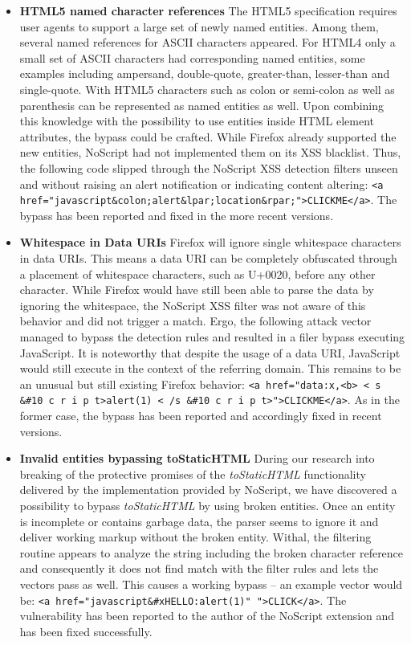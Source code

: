       \begin{itemize}
       \item \textbf{HTML5 named character references} The HTML5 specification requires user agents to support a large set of newly named entities. Among them, several named references for ASCII characters appeared. For HTML4 only a small set of ASCII characters had corresponding named entities, some examples including ampersand, double-quote, greater-than, lesser-than and single-quote. With HTML5 characters such as colon or semi-colon as well as parenthesis can be represented as named entities as well. Upon combining this knowledge with the possibility to use entities inside HTML element attributes, the bypass could be crafted. While Firefox already supported the new entities, NoScript had not implemented them on its XSS blacklist. Thus, the following code slipped through the NoScript XSS detection filters unseen and without raising an alert notification or indicating content altering: \texttt{<a href="javascript\&colon;alert\&lpar;location\&rpar;">CLICKME</a>}. The bypass has been reported and fixed in the 
more recent versions.
       \item \textbf{Whitespace in Data URIs} Firefox will ignore single whitespace characters in data URIs. This means a data URI can be completely obfuscated through a placement of whitespace characters, such as U+0020, before any other character. While Firefox would have still been able to parse the data by ignoring the whitespace, the NoScript XSS filter was not aware of this behavior and did not trigger a match. Ergo, the following attack vector managed to bypass the detection rules and resulted in a filer bypass executing JavaScript. It is noteworthy that despite the usage of a data URI, JavaScript would still execute in the context of the referring domain. This remains to be an unusual but still existing Firefox behavior: \texttt{<a href="data:x,<b> < s \&\#10 c r i p t>alert(1) < /s \&\#10 c r i p t>">CLICKME</a>}. As in the former case, the bypass has been reported and accordingly fixed in recent versions.
       \item \textbf{Invalid entities bypassing toStaticHTML} During our research into breaking of the protective promises of the \textit{toStaticHTML} functionality delivered by the implementation provided by NoScript, we have discovered a possibility to bypass \textit{toStaticHTML} by using broken entities. Once an entity is incomplete or contains garbage data, the parser seems to ignore it and deliver working markup without the broken entity. Withal, the filtering routine appears to analyze the string including the broken character reference and consequently it does not find match with the filter rules and lets the vectors pass as well. This causes a working bypass -- an example vector would be: \texttt{<a href="javascript\&\#xHELLO:alert(1)" ">CLICK</a>}. The vulnerability has been reported to the author of the NoScript extension and has been fixed successfully. 
      \end{itemize}


